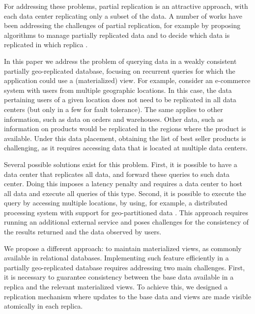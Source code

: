 \documentclass{vldb}
\begin{document}
For addressing these problems, partial replication is an attractive approach, with each data center
replicating only a subset of the data. A number of works have been addressing the challenges of 
partial replication, for example by proposing algorithms to manage partially replicated data \cite{more,saturn,c3}
and to decide which data is replicated in which replica \cite{}.

In this paper we address the problem of querying data in a weakly consistent partially geo-replicated database, 
focusing on recurrent queries for which the application could use a (materialized) view.
For example, consider an e-commerce system with users from multiple geographic locations.
In this case, the data pertaining users of a given location does not need to be replicated in all data centers
(but only in a few for fault tolerance). The same applies to other information, such as data on orders and 
warehouses.
Other data, such as information on products would be replicated in the regions where the product
is available.  
Under this data placement, obtaining the list of best seller products is challenging, as it requires
accessing data that is located at multiple data centers.

Several possible solutions exist for this problem. 
First, it is possible to have a data center that replicates all data, and forward these queries to such data center.
Doing this imposes a latency penalty and requires a data center to host all data and execute all queries of this type. %
Second, it is possible to execute the query by accessing multiple locations, by using, for example, 
a distributed processing system with support for geo-partitioned data %
\cite{kloudas2015pixida,more}.
This approach requires running an additional external service and poses challenges for the consistency of the results
returned and the data observed by users.

We propose a different approach: to maintain materialized views, as commonly available in relational databases.
Implementing such feature efficiently in a partially geo-replicated database requires 
addressing two main challenges. 
First, it is necessary to guarantee consistency between the base data available in a replica and the 
relevant materialized views. To achieve this, we designed a replication mechanism where updates 
to the base data and views are made visible atomically in each replica.
\end{document}
